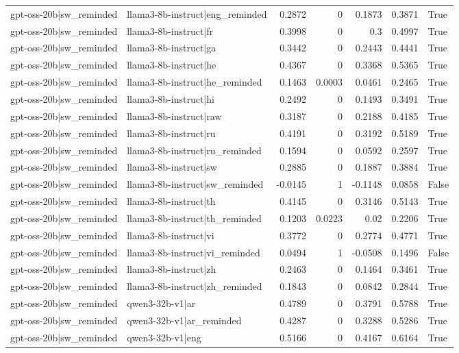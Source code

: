 \begin{table}
\begin{tabular}{l l r r r r l}
gpt-oss-20b|sw_reminded & llama3-8b-instruct|eng_reminded & 0.2872 & 0 & 0.1873 & 0.3871 & True \\
gpt-oss-20b|sw_reminded & llama3-8b-instruct|fr & 0.3998 & 0 & 0.3 & 0.4997 & True \\
gpt-oss-20b|sw_reminded & llama3-8b-instruct|ga & 0.3442 & 0 & 0.2443 & 0.4441 & True \\
gpt-oss-20b|sw_reminded & llama3-8b-instruct|he & 0.4367 & 0 & 0.3368 & 0.5365 & True \\
gpt-oss-20b|sw_reminded & llama3-8b-instruct|he_reminded & 0.1463 & 0.0003 & 0.0461 & 0.2465 & True \\
gpt-oss-20b|sw_reminded & llama3-8b-instruct|hi & 0.2492 & 0 & 0.1493 & 0.3491 & True \\
gpt-oss-20b|sw_reminded & llama3-8b-instruct|raw & 0.3187 & 0 & 0.2188 & 0.4185 & True \\
gpt-oss-20b|sw_reminded & llama3-8b-instruct|ru & 0.4191 & 0 & 0.3192 & 0.5189 & True \\
gpt-oss-20b|sw_reminded & llama3-8b-instruct|ru_reminded & 0.1594 & 0 & 0.0592 & 0.2597 & True \\
gpt-oss-20b|sw_reminded & llama3-8b-instruct|sw & 0.2885 & 0 & 0.1887 & 0.3884 & True \\
gpt-oss-20b|sw_reminded & llama3-8b-instruct|sw_reminded & -0.0145 & 1 & -0.1148 & 0.0858 & False \\
gpt-oss-20b|sw_reminded & llama3-8b-instruct|th & 0.4145 & 0 & 0.3146 & 0.5143 & True \\
gpt-oss-20b|sw_reminded & llama3-8b-instruct|th_reminded & 0.1203 & 0.0223 & 0.02 & 0.2206 & True \\
gpt-oss-20b|sw_reminded & llama3-8b-instruct|vi & 0.3772 & 0 & 0.2774 & 0.4771 & True \\
gpt-oss-20b|sw_reminded & llama3-8b-instruct|vi_reminded & 0.0494 & 1 & -0.0508 & 0.1496 & False \\
gpt-oss-20b|sw_reminded & llama3-8b-instruct|zh & 0.2463 & 0 & 0.1464 & 0.3461 & True \\
gpt-oss-20b|sw_reminded & llama3-8b-instruct|zh_reminded & 0.1843 & 0 & 0.0842 & 0.2844 & True \\
gpt-oss-20b|sw_reminded & qwen3-32b-v1|ar & 0.4789 & 0 & 0.3791 & 0.5788 & True \\
gpt-oss-20b|sw_reminded & qwen3-32b-v1|ar_reminded & 0.4287 & 0 & 0.3288 & 0.5286 & True \\
gpt-oss-20b|sw_reminded & qwen3-32b-v1|eng & 0.5166 & 0 & 0.4167 & 0.6164 & True \\

\end{tabular}
\end{table}

